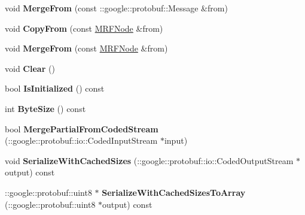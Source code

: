 \begin{DoxyCompactItemize}
\item 
\hypertarget{classgraph_1_1MRFNode_a9c35a74300cf3dca0218bcaeab056068}{
void {\bfseries MergeFrom} (const ::google::protobuf::Message \&from)}
\label{classgraph_1_1MRFNode_a9c35a74300cf3dca0218bcaeab056068}

\item 
\hypertarget{classgraph_1_1MRFNode_ab7f56050e7e981a5aea088fc4703a03b}{
void {\bfseries CopyFrom} (const \hyperlink{classgraph_1_1MRFNode}{MRFNode} \&from)}
\label{classgraph_1_1MRFNode_ab7f56050e7e981a5aea088fc4703a03b}

\item 
\hypertarget{classgraph_1_1MRFNode_ac4758815f0eb1ccb68720627100fbeb5}{
void {\bfseries MergeFrom} (const \hyperlink{classgraph_1_1MRFNode}{MRFNode} \&from)}
\label{classgraph_1_1MRFNode_ac4758815f0eb1ccb68720627100fbeb5}

\item 
\hypertarget{classgraph_1_1MRFNode_a610d843b6af3c9943e096adae1c878b9}{
void {\bfseries Clear} ()}
\label{classgraph_1_1MRFNode_a610d843b6af3c9943e096adae1c878b9}

\item 
\hypertarget{classgraph_1_1MRFNode_a4ee069fb613a4c42ce0b46a092905989}{
bool {\bfseries IsInitialized} () const }
\label{classgraph_1_1MRFNode_a4ee069fb613a4c42ce0b46a092905989}

\item 
\hypertarget{classgraph_1_1MRFNode_ab4cddf5ea1745f095b447d80a7e317b8}{
int {\bfseries ByteSize} () const }
\label{classgraph_1_1MRFNode_ab4cddf5ea1745f095b447d80a7e317b8}

\item 
\hypertarget{classgraph_1_1MRFNode_a7d517e721e300ebe179ef71f53ee2665}{
bool {\bfseries MergePartialFromCodedStream} (::google::protobuf::io::CodedInputStream $\ast$input)}
\label{classgraph_1_1MRFNode_a7d517e721e300ebe179ef71f53ee2665}

\item 
\hypertarget{classgraph_1_1MRFNode_a7d0379969f1c04b3753f3af41fcdcd8d}{
void {\bfseries SerializeWithCachedSizes} (::google::protobuf::io::CodedOutputStream $\ast$output) const }
\label{classgraph_1_1MRFNode_a7d0379969f1c04b3753f3af41fcdcd8d}

\item 
\hypertarget{classgraph_1_1MRFNode_a431f40e14bf444513150bf03d8a02863}{
::google::protobuf::uint8 $\ast$ {\bfseries SerializeWithCachedSizesToArray} (::google::protobuf::uint8 $\ast$output) const }
\label{classgraph_1_1MRFNode_a431f40e14bf444513150bf03d8a02863}


\end{DoxyCompactItemize}
